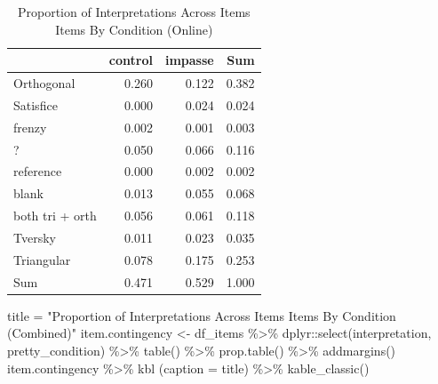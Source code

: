 \documentclass[
  letterpaper,
  DIV=11,
  numbers=noendperiod]{scrreprt}
\newenvironment{Shaded}{\begin{snugshade}}{\end{snugshade}}
\newcommand{\AttributeTok}[1]{\textcolor[rgb]{0.40,0.45,0.13}{#1}}
\newcommand{\FunctionTok}[1]{\textcolor[rgb]{0.28,0.35,0.67}{#1}}
\newcommand{\NormalTok}[1]{\textcolor[rgb]{0.00,0.23,0.31}{#1}}
\newcommand{\OtherTok}[1]{\textcolor[rgb]{0.00,0.23,0.31}{#1}}
\newcommand{\SpecialCharTok}[1]{\textcolor[rgb]{0.37,0.37,0.37}{#1}}
\newcommand{\StringTok}[1]{\textcolor[rgb]{0.13,0.47,0.30}{#1}}
\begin{document}
\begin{table}

\caption{Proportion of Interpretations Across Items Items By Condition (Online)}
\centering
\begin{tabular}[t]{l|r|r|r}
\hline
  & control & impasse & Sum\\
\hline
Orthogonal & 0.260 & 0.122 & 0.382\\
\hline
Satisfice & 0.000 & 0.024 & 0.024\\
\hline
frenzy & 0.002 & 0.001 & 0.003\\
\hline
? & 0.050 & 0.066 & 0.116\\
\hline
reference & 0.000 & 0.002 & 0.002\\
\hline
blank & 0.013 & 0.055 & 0.068\\
\hline
both tri + orth & 0.056 & 0.061 & 0.118\\
\hline
Tversky & 0.011 & 0.023 & 0.035\\
\hline
Triangular & 0.078 & 0.175 & 0.253\\
\hline
Sum & 0.471 & 0.529 & 1.000\\
\hline
\end{tabular}
\end{table}

\begin{Shaded}
\begin{Highlighting}[]
\NormalTok{title }\OtherTok{=} \StringTok{"Proportion of Interpretations Across Items Items By Condition (Combined)"}
\NormalTok{item.contingency }\OtherTok{\textless{}{-}}\NormalTok{ df\_items }\SpecialCharTok{\%\textgreater{}\%}\NormalTok{  dplyr}\SpecialCharTok{::}\FunctionTok{select}\NormalTok{(interpretation, pretty\_condition) }\SpecialCharTok{\%\textgreater{}\%} \FunctionTok{table}\NormalTok{() }\SpecialCharTok{\%\textgreater{}\%} \FunctionTok{prop.table}\NormalTok{() }\SpecialCharTok{\%\textgreater{}\%} \FunctionTok{addmargins}\NormalTok{()}
\NormalTok{item.contingency }\SpecialCharTok{\%\textgreater{}\%} \FunctionTok{kbl}\NormalTok{ (}\AttributeTok{caption =}\NormalTok{ title) }\SpecialCharTok{\%\textgreater{}\%} \FunctionTok{kable\_classic}\NormalTok{()}
\end{Highlighting}
\end{Shaded}
\end{document}
